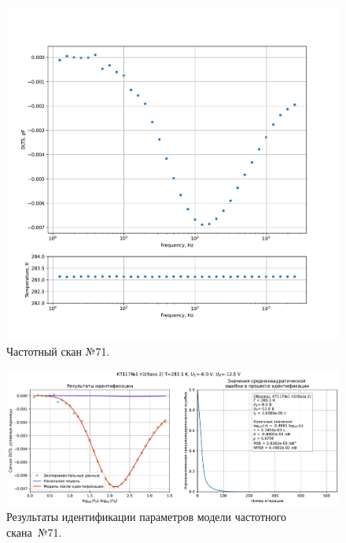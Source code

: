 \begin{figure}[!ht]
    \centering
    \includegraphics[width=1\textwidth]{../plots/КТ117№1_п1(база 2)_2500Гц-1Гц_1пФ_+10С_-6В-12В_100мВ_20мкс_шаг_0,1.pdf}
    \caption{Частотный скан №71.}
    \label{pic:frequency_scan_71}
\end{figure}

\begin{figure}[!ht]
    \centering
    \includegraphics[width=1\textwidth]{../plots/КТ117№1_п1(база 2)_2500Гц-1Гц_1пФ_+10С_-6В-12В_100мВ_20мкс_шаг_0,1_model.pdf}
    \caption{Результаты идентификации параметров модели частотного скана~№71.}
    \label{pic:frequency_scan_model71}
\end{figure}

\pagebreak


